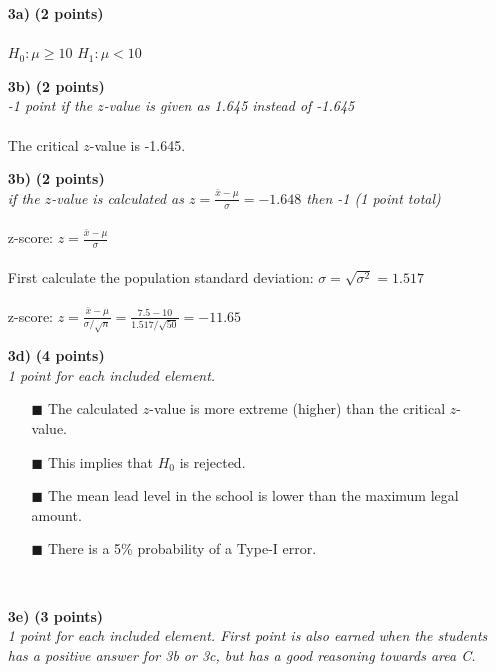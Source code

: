 \begin{itemize}
\item[\textbf{3a)}] \textbf{(2 points)} \\ \\
$H_0: \mu \geq 10$ \hspace{3cm} $H_1: \mu < 10$ \\
\item[\textbf{3b)}] \textbf{(2 points)} \\
\textit{-1 point if the $z$-value is given as 1.645 instead of -1.645} \\ \\
The critical $z$-value is -1.645. \\
\item[\textbf{3b)}] \textbf{(2 points)} \\
\textit{if the $z$-value is calculated as $z = \frac{\bar{x} - \mu}{\sigma} = -1.648$ then -1 (1 point total)} \\ \\
z-score: $z = \frac{\bar{x} - \mu}{\sigma}$ \\ \\
First calculate the population standard deviation: $\sigma = \sqrt{\sigma^2} = 1.517$ \\ \\
z-score: $z = \frac{\bar{x} - \mu}{\sigma / \sqrt{n}} = \frac{7.5 - 10}{1.517 / \sqrt{50}} = -11.65$ \\
\item[\textbf{3d)}] \textbf{(4 points)} \\
\textit{1 point for each included element.}
        \begin{itemize}
        \item[$\blacksquare$] The calculated $z$-value is more extreme (higher) than the critical $z$-value.
        \item[$\blacksquare$] This implies that $H_0$ is rejected.
        \item[$\blacksquare$] The mean lead level in the school is lower than the maximum legal amount.
        \item[$\blacksquare$] There is a 5\% probability of a Type-I error.
        \end{itemize} \\
\item[\textbf{3e)}] \textbf{(3 points)} \\
\textit{1 point for each included element. First point is also earned when the students has a positive answer for 3b or 3c, but has a
good reasoning towards area C.}

\end{itemize}
